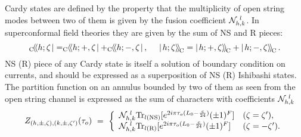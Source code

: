\documentclass[a4paper,12pt]{article}
\newcommand{\cbra}[1]{_{\rm C}\!\!\left<\!\left<{#1}\right.\right|}
\newcommand{\cket}[1]{\left|\left.{#1}\right>\!\right>_{\rm \!C}}
\newcommand{\NS}{{\rm NS}}
\newcommand{\R}{{\rm R}}
\begin{document}
   Cardy states are defined by the property that
 the multiplicity of open string modes between two of them is
 given by the fusion coefficient ${\cal N}_{h,k}^{~l}$.
 In superconformal field theories they are given by the sum
 of NS and R pieces:
\begin{equation}
  \cbra{h;\zeta} = \cbra{h;+,\zeta}+ \cbra{h;-,\zeta},~~~~
  \cket{h;\zeta} = \cket{h;+,\zeta}+ \cket{h;-,\zeta}.
\end{equation}
 NS (R) piece of any Cardy state is itself a solution of boundary
 condition on currents, and should be expressed as a superposition
 of NS (R) Ishibashi states.
 The partition function on an annulus bounded by two of them
 as seen from the open string channel is expressed as the sum
 of characters with coefficients ${\cal N}_{h,k}^{~l}$
\begin{equation}
  Z_{(h,\pm,\zeta),(k,\pm,\zeta')}(\tau_o)~=~
\left\{
\begin{array}{ll}
 {\cal N}_{h,k}^{~l}{\rm Tr}_{l(\NS)}
   [e^{2i\pi\tau_o(L_0-\frac{c}{24})}(\pm 1)^F] & (\zeta=\zeta'), \\
 {\cal N}_{h,k}^{~l}{\rm Tr}_{l(\R)}
   [e^{2i\pi\tau_o(L_0-\frac{c}{24})}(\pm 1)^F] & (\zeta=-\zeta').
\end{array}
\right.
\end{equation}
\end{document}
